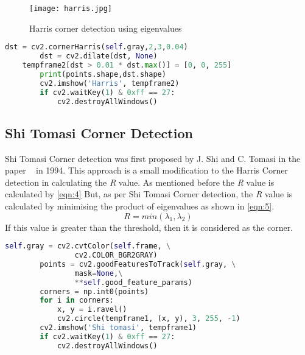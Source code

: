 \begin{figure}[tb]
	\center\texttt{[image: harris.jpg]}
	\caption{Harris corner detection using eigenvalues}
	\label{fig:harris}
\end{figure}

\begin{lstlisting}[language=Python, frame=single, caption=Python Code to compute Harris Corner detection]
        dst = cv2.cornerHarris(self.gray,2,3,0.04)
        dst = cv2.dilate(dst, None)
	tempframe2[dst > 0.01 * dst.max()] = [0, 0, 255]
        print(points.shape,dst.shape)
        cv2.imshow('Harris', tempframe2)
        if cv2.waitKey(1) & 0xff == 27:
            cv2.destroyAllWindows()
\end{lstlisting}

\subsection{Shi Tomasi Corner Detection}
Shi Tomasi Corner detection was first proposed by J. Shi and C. Tomasi in the paper ~\cite{shi1994good} in 1994. This approach is a small modification to the Harris Corner detection in calculating the \textit{R} value. As mentioned before the \textit{R} value is calculated by \ref{eqn:4}
But, as per Shi Tomasi Corner detection, the \textit{R} value is calculated by minimising the product of eigenvalues as shown in \ref{eqn:5}.
 \begin{equation}\label{eqn:5}
	R = min(\lambda_{1}, \lambda_{2})
\end{equation}
If this value is greater than the threshold, then it is considered as the corner.

\begin{lstlisting}[language=Python, frame=single, caption=Python Code to compute Shi Tomasi Corner detection]
        self.gray = cv2.cvtColor(self.frame, \
        		cv2.COLOR_BGR2GRAY)
        points = cv2.goodFeaturesToTrack(self.gray, \
        		mask=None,\
        		**self.good_feature_params)
        corners = np.int0(points)
        for i in corners:
            x, y = i.ravel()
            cv2.circle(tempframe1, (x, y), 3, 255, -1)
        cv2.imshow('Shi tomasi', tempframe1)
        if cv2.waitKey(1) & 0xff == 27:
            cv2.destroyAllWindows()
\end{lstlisting}

